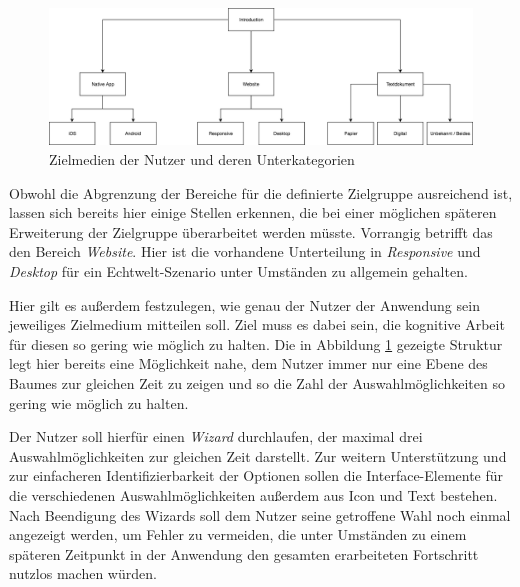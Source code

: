 \begin{figure}[h]
    \centering
    \includegraphics[width=1\textwidth]{images/ablauf_intro.png}
    \caption{Zielmedien der Nutzer und deren Unterkategorien}
    \label{fig:intro}
\end{figure}

Obwohl die Abgrenzung der Bereiche für die definierte Zielgruppe ausreichend ist, lassen sich bereits hier einige Stellen erkennen, die bei einer möglichen späteren Erweiterung der Zielgruppe überarbeitet werden müsste. Vorrangig betrifft das den Bereich \textit{Website}. Hier ist die vorhandene Unterteilung in \textit{Responsive} und \textit{Desktop} für ein Echtwelt-Szenario unter Umständen zu allgemein gehalten.

Hier gilt es außerdem festzulegen, wie genau der Nutzer der Anwendung sein jeweiliges Zielmedium mitteilen soll. Ziel muss es dabei sein, die kognitive Arbeit\footnotemark{} für diesen so gering wie möglich zu halten. Die in Abbildung \ref{fig:intro} gezeigte Struktur legt hier bereits eine Möglichkeit nahe, dem Nutzer immer nur eine Ebene des Baumes zur gleichen Zeit zu zeigen und so die Zahl der Auswahlmöglichkeiten so gering wie möglich zu halten.\\


Der Nutzer soll hierfür einen \textit{Wizard}\footnotemark{} durchlaufen, der maximal drei Auswahlmöglichkeiten zur gleichen Zeit darstellt. Zur weitern Unterstützung und zur einfacheren Identifizierbarkeit der Optionen sollen die Interface-Elemente für die verschiedenen Auswahlmöglichkeiten außerdem aus Icon und Text bestehen.
Nach Beendigung des Wizards soll dem Nutzer seine getroffene Wahl noch einmal angezeigt werden, um Fehler zu vermeiden, die unter Umständen zu einem späteren Zeitpunkt in der Anwendung den gesamten erarbeiteten Fortschritt nutzlos machen würden.

